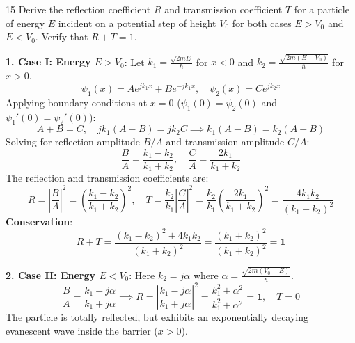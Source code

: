 \begin{theoryq}{15}
Derive the reflection coefficient $R$ and transmission coefficient $T$ for a particle of energy $E$ incident on a potential step of height $V_0$ for both cases $E > V_0$ and $E < V_0$. Verify that $R + T = 1$.
\end{theoryq}
\begin{theorysol}
\textbf{1. Case I: Energy $E > V_0$}:
Let $k_1 = \frac{\sqrt{2mE}}{\hbar}$ for $x < 0$ and $k_2 = \frac{\sqrt{2m(E - V_0)}}{\hbar}$ for $x > 0$.
\begin{equation}
\psi_1(x) = A e^{j k_1 x} + B e^{-j k_1 x},\quad \psi_2(x) = C e^{j k_2 x}
\end{equation}
Applying boundary conditions at $x=0$ ($\psi_1(0)=\psi_2(0)$ and $\psi_1'(0)=\psi_2'(0)$):
\begin{equation}
A + B = C,\quad j k_1(A - B) = j k_2 C \implies k_1(A - B) = k_2(A + B)
\end{equation}
Solving for reflection amplitude $B/A$ and transmission amplitude $C/A$:
\begin{equation}
\frac{B}{A} = \frac{k_1 - k_2}{k_1 + k_2},\quad \frac{C}{A} = \frac{2k_1}{k_1 + k_2}
\end{equation}
The reflection and transmission coefficients are:
\begin{equation}
R = \left|\frac{B}{A}\right|^2 = \left(\frac{k_1 - k_2}{k_1 + k_2}\right)^2,\quad T = \frac{k_2}{k_1}\left|\frac{C}{A}\right|^2 = \frac{k_2}{k_1}\left(\frac{2k_1}{k_1 + k_2}\right)^2 = \frac{4k_1 k_2}{(k_1 + k_2)^2}
\end{equation}
\textbf{Conservation}:
\begin{equation}
R + T = \frac{(k_1 - k_2)^2 + 4k_1 k_2}{(k_1 + k_2)^2} = \frac{(k_1 + k_2)^2}{(k_1 + k_2)^2} = \mathbf{1}
\end{equation}

\textbf{2. Case II: Energy $E < V_0$}:
Here $k_2 = j\alpha$ where $\alpha = \frac{\sqrt{2m(V_0 - E)}}{\hbar}$.
\begin{equation}
\frac{B}{A} = \frac{k_1 - j\alpha}{k_1 + j\alpha} \implies R = \left|\frac{k_1 - j\alpha}{k_1 + j\alpha}\right|^2 = \frac{k_1^2 + \alpha^2}{k_1^2 + \alpha^2} = \mathbf{1},\quad T = 0
\end{equation}
The particle is totally reflected, but exhibits an exponentially decaying evanescent wave inside the barrier ($x > 0$).
\end{theorysol}
\vspace{4mm}

